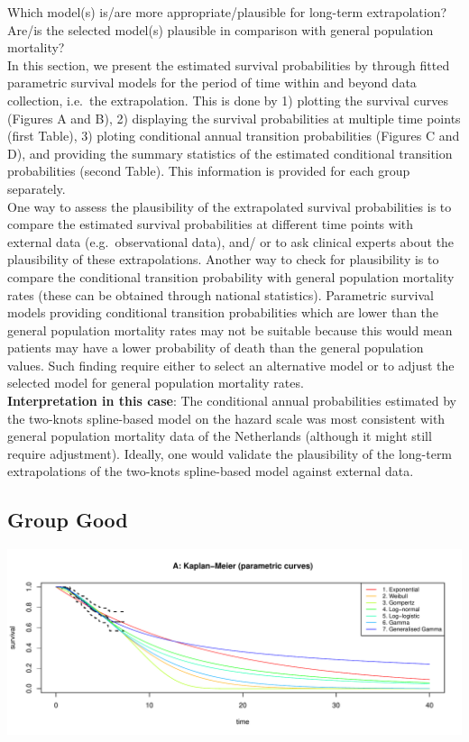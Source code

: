 \documentclass[]{article}
\begin{document}
Which model(s) is/are more appropriate/plausible for long-term
extrapolation?\\
Are/is the selected model(s) plausible in comparison with general
population mortality?\\
In this section, we present the estimated survival probabilities by
through fitted parametric survival models for the period of time within
and beyond data collection, i.e.~the extrapolation. This is done by 1)
plotting the survival curves (Figures A and B), 2) displaying the
survival probabilities at multiple time points (first Table), 3) ploting
conditional annual transition probabilities (Figures C and D), and
providing the summary statistics of the estimated conditional transition
probabilities (second Table). This information is provided for each
group separately.\\
One way to assess the plausibility of the extrapolated survival
probabilities is to compare the estimated survival probabilities at
different time points with external data (e.g.~observational data), and/
or to ask clinical experts about the plausibility of these
extrapolations. Another way to check for plausibility is to compare the
conditional transition probability with general population mortality
rates (these can be obtained through national statistics). Parametric
survival models providing conditional transition probabilities which are
lower than the general population mortality rates may not be suitable
because this would mean patients may have a lower probability of death
than the general population values. Such finding require either to
select an alternative model or to adjust the selected model for general
population mortality rates.\\
\textbf{Interpretation in this case}: The conditional annual
probabilities estimated by the two-knots spline-based model on the
hazard scale was most consistent with general population mortality data
of the Netherlands (although it might still require adjustment).
Ideally, one would validate the plausibility of the long-term
extrapolations of the two-knots spline-based model against external
data.

\newpage

\subsection{Group Good}\label{group-good}

\begin{flushleft}\includegraphics[height=0.29\textheight]{Images/validate_extrapolation1-1} \end{flushleft}
\end{document}
